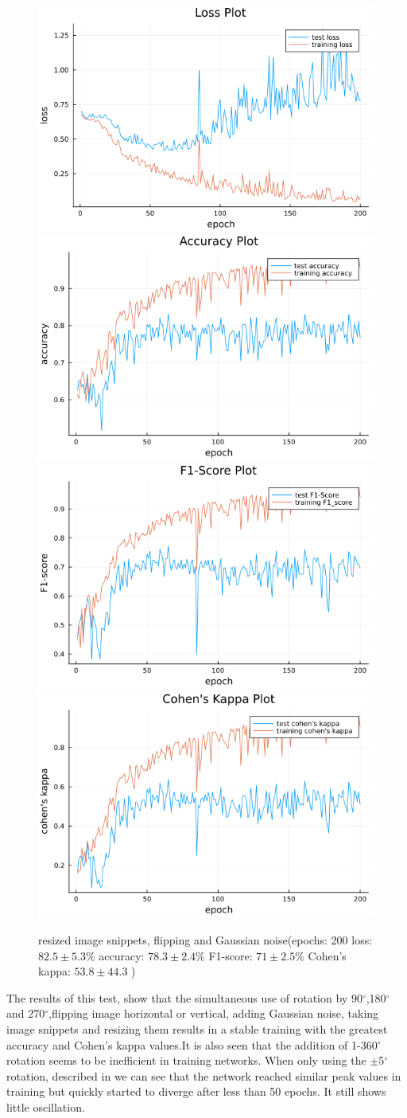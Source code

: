 \documentclass[
a4paper, 
12pt,
grayscalebody, %
abstract=on,
twoside, BCOR10mm, 12pt, DIV13,headinclude, footexclude, final, abstracton, openright
]{ibireprt}
\numberwithin{equation}{chapter}
\numberwithin{table}{chapter}
\numberwithin{figure}{chapter}
\numberwithin{algorithm}{chapter}
\numberwithin{example}{chapter}
\numberwithin{example}{chapter}
\begin{document}
\begin{figure}
	\includegraphics[width=0.4\linewidth]{loss_png_final_run_0_6.png}\hfill
	\includegraphics[width=0.4\linewidth]{accuracy_png_final_run_0_6.png}
	\\[\smallskipamount]
	\includegraphics[width=0.4\linewidth]{f1_score_png_final_run_0_6.png}\hfill
	\includegraphics[width=0.4\linewidth]{cohens_kappa_png_final_run_0_6.png}
	\caption{resized image snippets, flipping and Gaussian noise(epochs: 200 loss: $82.5\pm5.3\% $ accuracy: $78.3\pm2.4\%$ F1-score: $71\pm2.5\%$  Cohen's kappa: $53.8\pm44.3$ )}
\end{figure}%

	\clearpage

The results of this test, show that the simultaneous use of rotation by 90$^{\circ}$,180$^{\circ}$ and 270$^{\circ}$,flipping image horizontal or vertical, adding Gaussian noise, taking image snippets and resizing them results in a stable training with the greatest accuracy and Cohen's kappa values.It is also seen that the addition of 1-360$^{\circ}$ rotation seems to be inefficient in training networks. When only using the $\pm$5$^{\circ}$ rotation, described in \cite{Zhang2020} we can see that  the network reached similar peak values in training but quickly started to diverge after less than 50 epochs. It still shows little oscillation.
\end{document}
